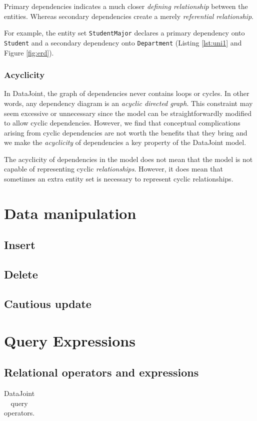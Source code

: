 \documentclass[letter,10pt]{article}
\begin{document}
Primary dependencies indicates a much closer \emph{defining relationship} between the entities. Whereas secondary dependencies create a merely \emph{referential relationship}.

For example, the entity set \lstinline$StudentMajor$ declares a primary dependency onto \lstinline$Student$ and a secondary dependency onto \lstinline$Department$ (Listing \ref{lst:uni1} and Figure \ref{fig:erd}).


\subsubsection{Acyclicity}
In DataJoint, the graph of dependencies never contains loops or cycles.  
In other words, any dependency diagram is an \emph{acyclic directed graph}.
This constraint may seem excessive or unnecessary since the model can be straightforwardly modified to allow cyclic dependencies. 
However, we find that conceptual complications arising from cyclic dependencies are not worth the benefits that they bring and we make the \emph{acyclicity} of dependencies a key property of the DataJoint model.

The acyclicity of dependencies in the model does not mean that the model is not capable of representing cyclic \emph{relationships}. 
However, it does mean that sometimes an extra entity set is necessary to represent cyclic relationships. 

\section{Data manipulation}\label{sec:manip}
\subsection{Insert}
\subsection{Delete}
\subsection{Cautious update}

\section{Query Expressions}\label{sec:query}
\subsection{Relational operators and expressions}
\begin{table}[ht]
\begin{tabu}{|X|}
\hline
\hline
\end{tabu}
\caption{DataJoint query operators.}
\label{tab:operators}
\end{table}
\end{document}
